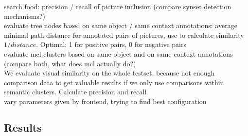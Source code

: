 search food: precision  / recall of picture inclusion (compare synset detection mechanisms?) \\
evaluate tree nodes based on same object / same context annotations: average minimal path distance for annotated pairs of pictures, use to calculate similarity $1/distance$. Optimal: 1 for positive pairs, 0 for negative pairs\\
evaluate mcl clusters based on same object and on same context annotations (compare both, what does mcl actually do?) \\

We evaluate visual similarity on the whole testset, because not enough comparison data to get valuable results if we only use comparisons within semantic clusters. Calculate precision and recall\\

vary parameters given by frontend, trying to find best configuration \\

\subsection{Results}

